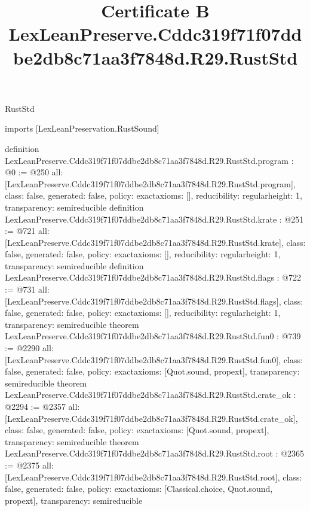 \begin{lexlean}{RustStd}
\title{Certificate B LexLeanPreserve.Cddc319f71f07ddbe2db8c71aa3f7848d.R29.RustStd}
\begin{coremodule}
imports [LexLeanPreservation.RustSound]

definition LexLeanPreserve.Cddc319f71f07ddbe2db8c71aa3f7848d.R29.RustStd.program : @0 := @250 {
  all: [LexLeanPreserve.Cddc319f71f07ddbe2db8c71aa3f7848d.R29.RustStd.program],
  class: false,
  generated: false,
  policy: exact{axioms: []},
  reducibility: regular{height: 1},
  transparency: semireducible
}
definition LexLeanPreserve.Cddc319f71f07ddbe2db8c71aa3f7848d.R29.RustStd.krate : @251 := @721 {
  all: [LexLeanPreserve.Cddc319f71f07ddbe2db8c71aa3f7848d.R29.RustStd.krate],
  class: false,
  generated: false,
  policy: exact{axioms: []},
  reducibility: regular{height: 1},
  transparency: semireducible
}
definition LexLeanPreserve.Cddc319f71f07ddbe2db8c71aa3f7848d.R29.RustStd.flags : @722 := @731 {
  all: [LexLeanPreserve.Cddc319f71f07ddbe2db8c71aa3f7848d.R29.RustStd.flags],
  class: false,
  generated: false,
  policy: exact{axioms: []},
  reducibility: regular{height: 1},
  transparency: semireducible
}
theorem LexLeanPreserve.Cddc319f71f07ddbe2db8c71aa3f7848d.R29.RustStd.fun0 : @739 := @2290 {
  all: [LexLeanPreserve.Cddc319f71f07ddbe2db8c71aa3f7848d.R29.RustStd.fun0],
  class: false,
  generated: false,
  policy: exact{axioms: [Quot.sound, propext]},
  transparency: semireducible
}
theorem LexLeanPreserve.Cddc319f71f07ddbe2db8c71aa3f7848d.R29.RustStd.crate_ok : @2294 := @2357 {
  all: [LexLeanPreserve.Cddc319f71f07ddbe2db8c71aa3f7848d.R29.RustStd.crate_ok],
  class: false,
  generated: false,
  policy: exact{axioms: [Quot.sound, propext]},
  transparency: semireducible
}
theorem LexLeanPreserve.Cddc319f71f07ddbe2db8c71aa3f7848d.R29.RustStd.root : @2365 := @2375 {
  all: [LexLeanPreserve.Cddc319f71f07ddbe2db8c71aa3f7848d.R29.RustStd.root],
  class: false,
  generated: false,
  policy: exact{axioms: [Classical.choice, Quot.sound, propext]},
  transparency: semireducible
}


\end{coremodule}
\end{lexlean}
